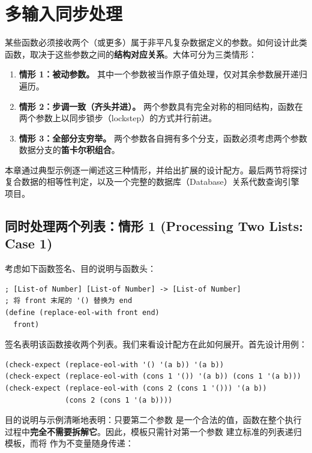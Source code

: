 
\chapter{多输入同步处理}
\label{sec:ch23_simultaneous}

某些函数必须接收两个（或更多）属于非平凡复杂数据定义的参数。如何设计此类函数，取决于这些参数之间的\textbf{结构对应关系}。大体可分为三类情形：
\begin{enumerate}
  \item \textbf{情形 1：被动参数。} 其中一个参数被当作原子值处理，仅对其余参数展开递归遍历。
  \item \textbf{情形 2：步调一致（齐头并进）。} 两个参数具有完全对称的相同结构，函数在两个参数上以同步锁步（lockstep）的方式并行前进。
  \item \textbf{情形 3：全部分支穷举。} 两个参数各自拥有多个分支，函数必须考虑两个参数数据分支的\textbf{笛卡尔积组合}。
\end{enumerate}

本章通过典型示例逐一阐述这三种情形，并给出扩展的设计配方。最后两节将探讨复合数据的相等性判定，以及一个完整的数据库（Database）关系代数查询引擎项目。

\section{同时处理两个列表：情形 1 (Processing Two Lists: Case 1)}
\label{sec:23.1_case1}

考虑如下函数签名、目的说明与函数头：
\begin{lstlisting}[language=BSL]
; [List-of Number] [List-of Number] -> [List-of Number]
; 将 front 末尾的 '() 替换为 end
(define (replace-eol-with front end)
  front)
\end{lstlisting}

签名表明该函数接收两个列表。我们来看设计配方在此如何展开。首先设计用例：
\begin{lstlisting}[language=BSL]
(check-expect (replace-eol-with '() '(a b)) '(a b))
(check-expect (replace-eol-with (cons 1 '()) '(a b)) (cons 1 '(a b)))
(check-expect (replace-eol-with (cons 2 (cons 1 '())) '(a b))
              (cons 2 (cons 1 '(a b))))
\end{lstlisting}

目的说明与示例清晰地表明：只要第二个参数  是一个合法的值，函数在整个执行过程中\textbf{完全不需要拆解它}。因此，模板只需针对第一个参数  建立标准的列表递归模板，而将  作为不变量随身传递：

